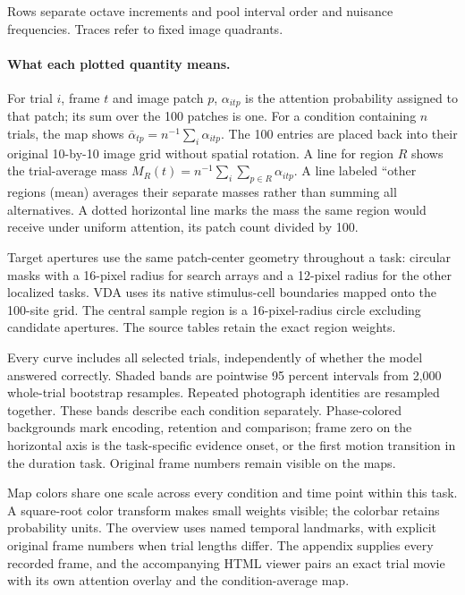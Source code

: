 \documentclass[11pt]{article}
\begin{document}
Rows separate octave increments and pool interval order and nuisance frequencies. Traces refer to fixed image quadrants.

\paragraph{What each plotted quantity means.}
For trial $i$, frame $t$ and image patch $p$, $\alpha_{itp}$ is the attention probability assigned to that patch; its sum over the 100 patches is one. For a condition containing $n$ trials, the map shows $\bar\alpha_{tp}=n^{-1}\sum_i\alpha_{itp}$. The 100 entries are placed back into their original 10-by-10 image grid without spatial rotation. A line for region $R$ shows the trial-average mass $M_R(t)=n^{-1}\sum_i\sum_{p\in R}\alpha_{itp}$. A line labeled ``other regions (mean) averages their separate masses rather than summing all alternatives. A dotted horizontal line marks the mass the same region would receive under uniform attention, its patch count divided by 100.

Target apertures use the same patch-center geometry throughout a task: circular masks with a 16-pixel radius for search arrays and a 12-pixel radius for the other localized tasks. VDA uses its native stimulus-cell boundaries mapped onto the 100-site grid. The central sample region is a 16-pixel-radius circle excluding candidate apertures. The source tables retain the exact region weights.

Every curve includes all selected trials, independently of whether the model answered correctly. Shaded bands are pointwise 95 percent intervals from 2,000 whole-trial bootstrap resamples. Repeated photograph identities are resampled together. These bands describe each condition separately. Phase-colored backgrounds mark encoding, retention and comparison; frame zero on the horizontal axis is the task-specific evidence onset, or the first motion transition in the duration task. Original frame numbers remain visible on the maps.

Map colors share one scale across every condition and time point within this task. A square-root color transform makes small weights visible; the colorbar retains probability units. The overview uses named temporal landmarks, with explicit original frame numbers when trial lengths differ. The appendix supplies every recorded frame, and the accompanying HTML viewer pairs an exact trial movie with its own attention overlay and the condition-average map.
\end{document}
